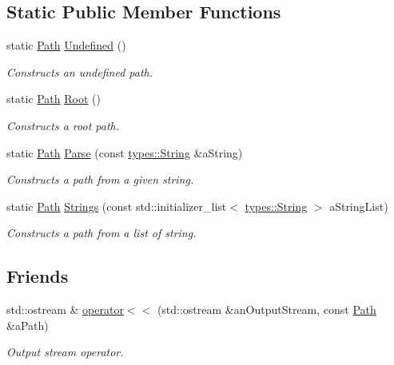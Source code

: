 \subsection*{Static Public Member Functions}
\begin{DoxyCompactItemize}
\item 
static \hyperlink{classlibrary_1_1core_1_1fs_1_1_path}{Path} \hyperlink{classlibrary_1_1core_1_1fs_1_1_path_a89cddd92be70121f2537726d69ca6499}{Undefined} ()
\begin{DoxyCompactList}\small\item\em Constructs an undefined path. \end{DoxyCompactList}\item 
static \hyperlink{classlibrary_1_1core_1_1fs_1_1_path}{Path} \hyperlink{classlibrary_1_1core_1_1fs_1_1_path_aa7276f3f578b7ebc40bb0fba7e9c2750}{Root} ()
\begin{DoxyCompactList}\small\item\em Constructs a root path. \end{DoxyCompactList}\item 
static \hyperlink{classlibrary_1_1core_1_1fs_1_1_path}{Path} \hyperlink{classlibrary_1_1core_1_1fs_1_1_path_aebf5bd3af83e0b7376616e146f3e55df}{Parse} (const \hyperlink{classlibrary_1_1core_1_1types_1_1_string}{types\+::\+String} \&a\+String)
\begin{DoxyCompactList}\small\item\em Constructs a path from a given string. \end{DoxyCompactList}\item 
static \hyperlink{classlibrary_1_1core_1_1fs_1_1_path}{Path} \hyperlink{classlibrary_1_1core_1_1fs_1_1_path_a8b5672cb98f78457824137454065897c}{Strings} (const std\+::initializer\+\_\+list$<$ \hyperlink{classlibrary_1_1core_1_1types_1_1_string}{types\+::\+String} $>$ a\+String\+List)
\begin{DoxyCompactList}\small\item\em Constructs a path from a list of string. \end{DoxyCompactList}\end{DoxyCompactItemize}
\subsection*{Friends}
\begin{DoxyCompactItemize}
\item 
std\+::ostream \& \hyperlink{classlibrary_1_1core_1_1fs_1_1_path_a87813ac3ede0b43b50ae6b9fdf0a2815}{operator$<$$<$} (std\+::ostream \&an\+Output\+Stream, const \hyperlink{classlibrary_1_1core_1_1fs_1_1_path}{Path} \&a\+Path)
\begin{DoxyCompactList}\small\item\em Output stream operator. \end{DoxyCompactList}\end{DoxyCompactItemize}


